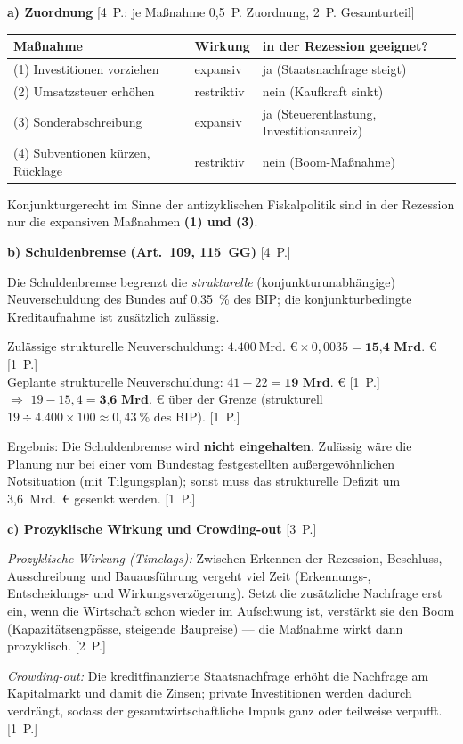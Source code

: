 \begin{loesung}[title={Lösung Aufgabe~3.6 --- Konjunkturprogramm und Schuldenbremse}]
\textbf{a) Zuordnung} \hfill [4~P.: je Maßnahme 0,5~P. Zuordnung, 2~P. Gesamturteil]

\begin{tabular}{p{6.4cm} p{2.4cm} p{4.4cm}}
\toprule
\textbf{Maßnahme} & \textbf{Wirkung} & \textbf{in der Rezession geeignet?}\\
\midrule
(1) Investitionen vorziehen & expansiv & ja (Staatsnachfrage steigt)\\
(2) Umsatzsteuer erhöhen & restriktiv & nein (Kaufkraft sinkt)\\
(3) Sonderabschreibung & expansiv & ja (Steuerentlastung, Investitionsanreiz)\\
(4) Subventionen kürzen, Rücklage & restriktiv & nein (Boom-Maßnahme)\\
\bottomrule
\end{tabular}

\smallskip
Konjunkturgerecht im Sinne der antizyklischen Fiskalpolitik sind in der Rezession nur die
expansiven Maßnahmen \textbf{(1) und (3)}.

\medskip
\textbf{b) Schuldenbremse (Art.~109, 115~GG)} \hfill [4~P.]

Die Schuldenbremse begrenzt die \emph{strukturelle} (konjunkturunabhängige)
Neuverschuldung des Bundes auf 0,35~\% des BIP; die konjunkturbedingte Kreditaufnahme
ist zusätzlich zulässig.

Zulässige strukturelle Neuverschuldung: $4.400~\text{Mrd.~€} \times 0{,}0035 =
\textbf{15,4~Mrd.~€}$ [1~P.]\\
Geplante strukturelle Neuverschuldung: $41 - 22 = \textbf{19~Mrd.~€}$ [1~P.]\\
$\Rightarrow$ $19 - 15{,}4 = \textbf{3,6~Mrd.~€}$ über der Grenze (strukturell
$19 \div 4.400 \times 100 \approx 0{,}43~\%$ des BIP). [1~P.]

Ergebnis: Die Schuldenbremse wird \textbf{nicht eingehalten}. Zulässig wäre die Planung
nur bei einer vom Bundestag festgestellten außergewöhnlichen Notsituation (mit
Tilgungsplan); sonst muss das strukturelle Defizit um 3,6~Mrd.~€ gesenkt werden. [1~P.]

\medskip
\textbf{c) Prozyklische Wirkung und Crowding-out} \hfill [3~P.]

\emph{Prozyklische Wirkung (Timelags):} Zwischen Erkennen der Rezession, Beschluss,
Ausschreibung und Bauausführung vergeht viel Zeit (Erkennungs-, Entscheidungs- und
Wirkungsverzögerung). Setzt die zusätzliche Nachfrage erst ein, wenn die Wirtschaft
schon wieder im Aufschwung ist, verstärkt sie den Boom (Kapazitätsengpässe,
steigende Baupreise) --- die Maßnahme wirkt dann prozyklisch. [2~P.]

\emph{Crowding-out:} Die kreditfinanzierte Staatsnachfrage erhöht die Nachfrage am
Kapitalmarkt und damit die Zinsen; private Investitionen werden dadurch verdrängt, sodass
der gesamtwirtschaftliche Impuls ganz oder teilweise verpufft. [1~P.]
\end{loesung}

